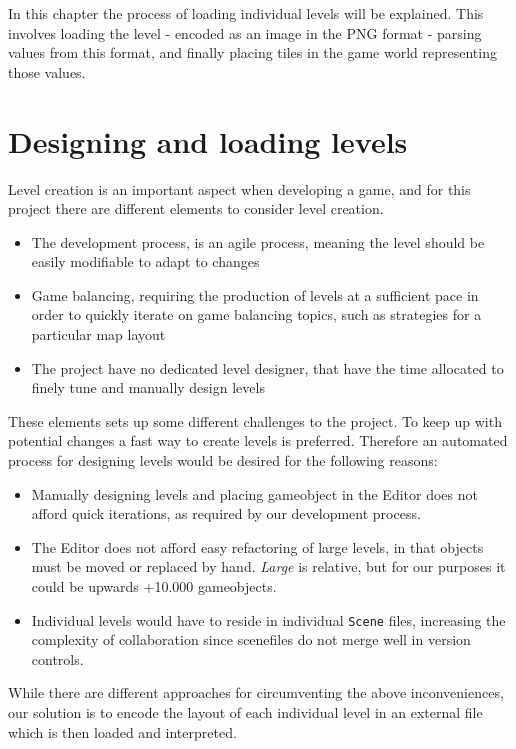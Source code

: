 In this chapter the process of loading individual levels will be explained. This involves loading the level - encoded as an image in the PNG format -
parsing values from this format, and finally placing tiles in the game world
representing those values.

\section{Designing and loading levels}
Level creation is an important aspect when developing a game, and for this project there are different elements to consider level creation.
\begin{itemize}
    \item The development process, is an agile process, meaning the level should be easily modifiable to adapt to changes
    
    \item Game balancing, requiring the production of levels at a sufficient pace in
        order to quickly iterate on game balancing topics, such as strategies
        for a particular map layout
        
    \item The project have no dedicated level designer, that have the time
        allocated to finely tune and manually design levels
\end{itemize}
These elements sets up some different challenges to the project. 
To keep up with potential changes a fast way to create levels is preferred.
Therefore an automated process for designing levels would be desired for the following reasons:
\begin{itemize}
    \item Manually designing levels and placing gameobject in the Editor does
        not afford quick iterations, as required by our development process.
    \item The Editor does not afford easy refactoring of large levels, in that
        objects must be moved or replaced by hand. \textit{Large} is relative,
        but for our purposes it could be upwards +10.000 gameobjects.
    \item Individual levels would have to reside in individual \texttt{Scene}
        files, increasing the complexity of collaboration since scenefiles do
        not merge well in version controls.
\end{itemize}
While there are different approaches for circumventing the above inconveniences, our solution is to encode the layout of each individual level in an external file which is then loaded and interpreted. 
